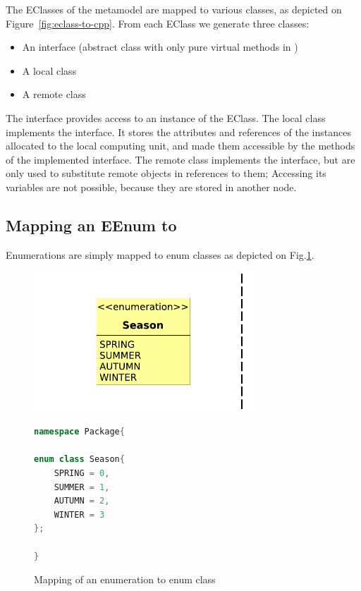 The EClasses of the metamodel are mapped to various \cpp{} classes, as depicted on \mbox{Figure~\ref{fig:eclass-to-cpp}}.
From each EClass we generate three \cpp{} classes:

\begin{itemize}
	\item An interface (abstract class with only pure virtual methods in \cpp{})
	\item A local class
	\item A remote class
\end{itemize}


The interface provides access to an instance of the EClass.
The local class implements the interface. It stores the attributes and references of the instances allocated to the local computing unit, and made them accessible by the methods of the implemented interface.
The remote class implements the interface, but are only used to substitute remote objects in references to them; 
Accessing its variables are not possible, because they are stored in another node. 

\subsection{Mapping an EEnum to \protect\cpp }

Enumerations are simply mapped to \cpp{} enum classes as depicted on Fig.\ref{fig:eenum-to-cpp}.

\begin{figure}[H]
	\begin{center}
		
		\begin{minipage}[c]{\textwidth}
		\begin{minipage}[r]{0.52\textwidth}
			\hfill
			\includegraphics[width=0.735\textwidth]{figures/eenum-to-cpp.pdf}
		\end{minipage}
			\hspace{0.05\textwidth}
		\begin{minipage}[c]{0.25\textwidth}
\begin{lstlisting}[language=C++]
namespace Package{

enum class Season{
	SPRING = 0,
	SUMMER = 1,
	AUTUMN = 2,
	WINTER = 3
};

}
\end{lstlisting}			
		\end{minipage}
		\end{minipage}
		\caption{Mapping of an enumeration to \protect\cpp{} enum class }
		\label{fig:eenum-to-cpp}
	\end{center}
\end{figure}


